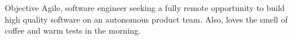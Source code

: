 \begin{section}{Objective}
  Agile, software engineer seeking a fully remote opportunity to build high quality software on an autonomous product team. Also, loves the smell of coffee and warm tests in the morning.
\end{section}
